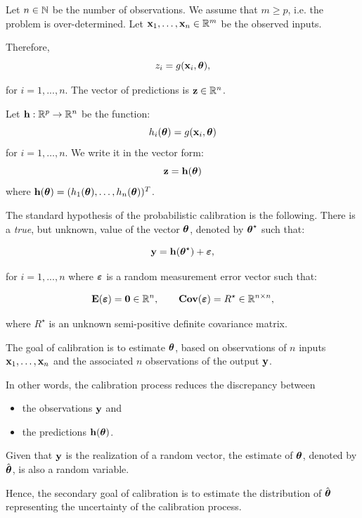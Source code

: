 \documentclass{beamer}
\begin{document}

\begin{frame}
Let $n \in \mathbb{N}$ be the number of observations. 
We assume that $m \geq p$, i.e. the problem is over-determined. 
Let ${\bf x}_1, \ldots, {\bf x}_n \in \mathbb{R}^{m}$ be the observed inputs. 

Therefore, 
$$
z_i = g({\bf x}_i, \boldsymbol{\theta}),
$$

for $i=1,...,n$. 
The vector of predictions is ${\bf z} \in \mathbb{R}^{n}$. 

Let ${\bf h} : \mathbb{R}^p \rightarrow \mathbb{R}^{n}$ be the function:
$$
h_i(\boldsymbol{\theta}) = g({\bf x}_i, \boldsymbol{\theta})
$$
for $i=1, \ldots, n$. 
We write it in the vector form:
$$
{\bf z} = {\bf h}(\boldsymbol{\theta})
$$
where ${\bf h}(\boldsymbol{\theta}) = (h_1(\boldsymbol{\theta}), \ldots, h_n(\boldsymbol{\theta}))^T$.

\end{frame}


\begin{frame}
The standard hypothesis of the probabilistic calibration is the following. 
There is a \emph{true}, but unknown, value of the vector $\boldsymbol{\theta}$, 
denoted by $\boldsymbol{\theta}^\star$ such that:

$$
{\bf y} = {\bf h}(\boldsymbol{\theta}^\star) + \boldsymbol{\varepsilon},
$$

for $i=1,...,n$ where $\boldsymbol{\varepsilon}$ is a random
measurement error vector such that:

$$
\mathbf{E}(\boldsymbol{\varepsilon}) = \boldsymbol{0} \in \mathbb{R}^{n}, \qquad 
\mathbf{Cov}(\boldsymbol{\varepsilon}) = R^\star \in \mathbb{R}^{n\times n},
$$

where $R^\star$ is an unknown semi-positive definite covariance matrix.

\end{frame}


\begin{frame}
The goal of calibration is to estimate $\boldsymbol{\theta}$, based on
observations of $n$ inputs
${\bf x}_1, \ldots, {\bf x}_n$ and the associated $n$
observations of the output ${\bf y}$. 

In other words, the calibration process reduces the discrepancy between 
\begin{itemize}
\item  the observations ${\bf y}$ and 
\item  the predictions ${\bf h}(\boldsymbol{\theta})$. 
\end{itemize}

Given that ${\bf y}$ is the realization of a random
vector, the estimate of $\boldsymbol{\theta}$, denoted by
$\hat{\boldsymbol{\theta}}$, is also a random variable. 

Hence, the secondary goal of calibration is to estimate the distribution of
$\hat{\boldsymbol{\theta}}$ representing the uncertainty of the
calibration process.

\end{frame}
\end{document}
